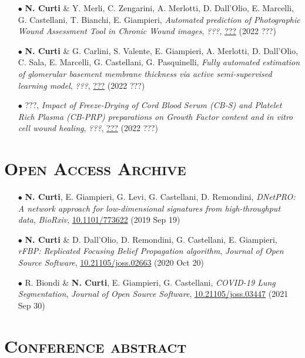 \documentclass[a4paper,11pt]{article}
\begin{document}
\begin{itemize}
  \item[$\bullet$] \textbf{N. Curti} \& Y. Merli, C. Zengarini, A. Merlotti, D. Dall'Olio, E. Marcelli, G. Castellani, T. Bianchi, E. Giampieri, \emph{Automated prediction of Photographic Wound Assessment Tool in Chronic Wound images}, \emph{???}, \url{???} (2022 ???)

  \item[$\bullet$] \textbf{N. Curti} \& G. Carlini, S. Valente, E. Giampieri, A. Merlotti, D. Dall'Olio, C. Sala, E. Marcelli, G. Castellani, G. Pasquinelli, \emph{Fully automated estimation of glomerular basement membrane thickness via active semi-supervised learning model}, \emph{???}, \url{???} (2022 ???)

  \item[$\bullet$] ???, \emph{Impact of Freeze-Drying of Cord Blood Serum (CB-S) and Platelet Rich Plasma (CB-PRP) preparations on Growth Factor content and in vitro cell wound healing}, \emph{???}, \url{???} (2022 ???)


\end{itemize}

\vspace*{0.5cm}
\section*{\scshape{Open Access Archive}}

\begin{itemize}

  \item[$\bullet$] \textbf{N. Curti}, E. Giampieri, G. Levi, G. Castellani, D. Remondini, \emph{DNetPRO: A network approach for low-dimensional signatures from high-throughput data}, \emph{BioRxiv}, \url{10.1101/773622} (2019 Sep 19)

  \item[$\bullet$] \textbf{N. Curti} \& D. Dall'Olio, D. Remondini, G. Castellani, E. Giampieri, \emph{rFBP: Replicated Focusing Belief Propagation algorithm}, \emph{Journal of Open Source Software}, \url{10.21105/joss.02663} (2020 Oct 20)

  \item[$\bullet$] R. Biondi \& \textbf{N. Curti}, E. Giampieri, G. Castellani, \emph{COVID-19 Lung Segmentation}, \emph{Journal of Open Source Software}, \url{10.21105/joss.03447} (2021 Sep 30)

\end{itemize}


\vspace*{0.5cm}
\section*{\scshape{Conference abstract}}
\end{document}
